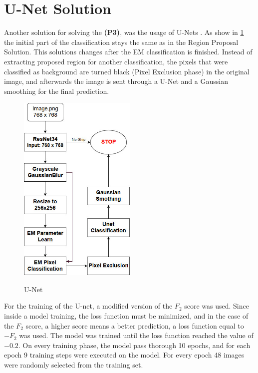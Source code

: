 \section{U-Net Solution}
Another solution for solving the \textbf{(P3)}, was the usage of U-Nets \cite{Unet}. As show in \ref{UnetArch} the initial part of the classification stays the same as in the Region Proposal Solution. This solutions changes after the EM classification is finished. Instead of extracting proposed region for another classification, the pixels that were classified as background are turned black (Pixel Exclusion phase) in the original image, and afterwards the image is sent through a U-Net and a Gaussian smoothing for the final prediction.
\begin{figure}[h]
	\centering
	\includegraphics[width=0.5\textwidth]{Pictures/013UnetArchitecture.jpg}\\
	\caption{U-Net}
	\label{UnetArch}
\end{figure}

For the training of the U-net, a modified version of the $F_2$ score was used. Since inside a model training, the loss function must be minimized, and in the case of the $F_2$ score, a higher score means a better prediction, a loss function equal to $-F_2$ was used. The model was trained until the loss function reached the value of $-0.2$. On every training phase, the model pass thorough 10 epochs, and for each epoch 9 training steps were executed on the model. For every epoch 48 images were randomly selected from the training set.

